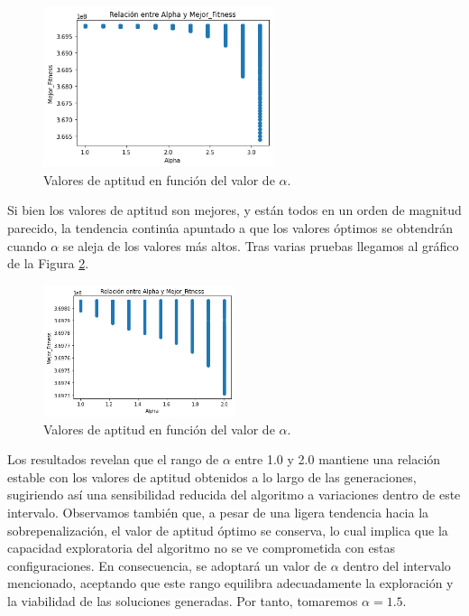 \documentclass[12pt,a4paper]{book}
\begin{document}
\begin{figure}[h] 
    	\begin{center}
    	\includegraphics[width=0.6\textwidth]{img/alpha_anl2.png}
    	\end{center}
    	\caption{Valores de aptitud en función del valor de $\alpha$.}
    	\label{fig:alpha_analisis2}
	\end{figure}

Si bien los valores de aptitud son mejores, y están todos en un orden de magnitud parecido, la tendencia continúa apuntado a que los valores óptimos se obtendrán cuando $\alpha$ se aleja de los valores más altos. Tras varias pruebas llegamos al gráfico de la Figura \ref{fig:alpha_analisis4}. 

\begin{figure}[h] 
    	\begin{center}
    	\includegraphics[width=0.5\textwidth]{img/alpha_anl4.png}
    	\end{center}
    	\caption{Valores de aptitud en función del valor de $\alpha$.}
    	\label{fig:alpha_analisis4}
	\end{figure}

Los resultados revelan que el rango de $\alpha$ entre 1.0 y 2.0 mantiene una relación estable con los valores de aptitud obtenidos a lo largo de las generaciones, sugiriendo así una sensibilidad reducida del algoritmo a variaciones dentro de este intervalo. Observamos también que, a pesar de una ligera tendencia hacia la sobrepenalización, el valor de aptitud óptimo se conserva, lo cual implica que la capacidad exploratoria del algoritmo no se ve comprometida con estas configuraciones. En consecuencia, se adoptará un valor de $\alpha$ dentro del intervalo mencionado, aceptando que este rango equilibra adecuadamente la exploración y la viabilidad de las soluciones generadas. Por tanto, tomaremos $\alpha=1.5$.
\end{document}
